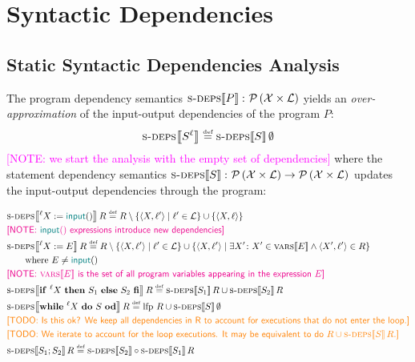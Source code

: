 \documentclass{article}
\newcommand{\defined}{\ensuremath{\stackrel{\mbox{\tiny def}}{=}}\xspace} %
\newcommand{\vars}{\ensuremath{\mathcal{X}}\xspace} %
\newcommand{\ipt}{\ensuremath{\mathbf{\mathsf{\color{teal}input}}()}\xspace} %
\newcommand{\powerset}[1]{\ensuremath{\mathcal{P}\left(#1\right)}\xspace} %
\newcommand{\tuple}[2]{\ensuremath{\langle #1, #2 \rangle}\xspace} %
\newcommand{\lfp}{\ensuremath{\mathrm{lfp}}\xspace} %
\newcommand{\labels}{\ensuremath{\mathcal{L}}\xspace} %
\newcommand{\semantics}[1]{\ensuremath{\left\llbracket #1 \right\rrbracket}\xspace} %
\newcommand{\sdeps}[1]{\ensuremath{\textsc{s-deps}\!\semantics{#1}}\xspace} %
\newcommand{\ids}[1]{\ensuremath{\textsc{vars}\!\semantics{#1}}\xspace} %
\newcommand{\irem}[3]{{\noindent\textcolor{#1}{\textsf{[#2: 
#3]}}}}
\newcommand{\todo}[1]{\irem{orange}{TODO}{#1}}
\newcommand{\note}[1]{\irem{magenta}{NOTE}{#1}}
\begin{document}
\pagebreak
\section*{Syntactic Dependencies}

\subsection*{Static Syntactic Dependencies Analysis}

The program dependency semantics $\sdeps{P} \colon \powerset{\vars \times \labels}$ yields an \emph{over-approximation} of the input-output dependencies of the program $P$:
\begin{equation*}
\sdeps{S^\ell{}} \defined \sdeps{S}\emptyset
\end{equation*}
\note{we start the analysis with the empty set of dependencies}
where the statement dependency semantics $\sdeps{S} \colon \powerset{\vars \times \labels} \rightarrow  \powerset{\vars \times \labels}$ updates the input-output dependencies through the program:

	\begin{align*}
	&\sdeps{^\ell{}X := \ipt}R \defined R \setminus \{ \tuple{X}{\ell{}'} \mid \ell{}' \in \labels \} \cup \{ \tuple{X}{\ell{}} \} 
	\\
	&\mbox{\note{\ipt expressions introduce new dependencies}} \\
	&\sdeps{^\ell{}X := E}R \defined R \setminus \{ \tuple{X}{\ell{}'} \mid \ell{}' \in \labels \} \cup \{ \tuple{X}{\ell{}'} \mid \exists X'\colon X' \in \ids{E} \land \tuple{X'}{\ell{}'} \in R \} \\
	&\qquad\mbox{where $E \not= \ipt$} \\
	&\mbox{\note{\ids{E} is the set of all program variables appearing in the expression $E$}} \\
%
	&\sdeps{\mathsf{\mathbf{if}}~^\ell{}X~\mathsf{\mathbf{then}}~S_1~\mathsf{\mathbf{else}}~S_2~\mathsf{\mathbf{fi}}}R
	 \defined \sdeps{S_1}R \cup \sdeps{S_2}R \\ 
%
&\sdeps{\mathsf{\mathbf{while}}~^\ell{}X~\mathsf{\mathbf{do}}~S~\mathsf{\mathbf{od}}}R
\defined \lfp~R \cup \sdeps{S}\emptyset  \\
&\todo{Is this ok? We keep all dependencies in R to account for executions that do not enter the loop.} \\
&\todo{We iterate to account for the loop executions. It may be equivalent to do $R \cup \sdeps{S}R$.} \\
%
&\sdeps{S_1; S_2}R \defined \sdeps{S_2} \circ 
\sdeps{S_1}R
	\end{align*}
\end{document}
